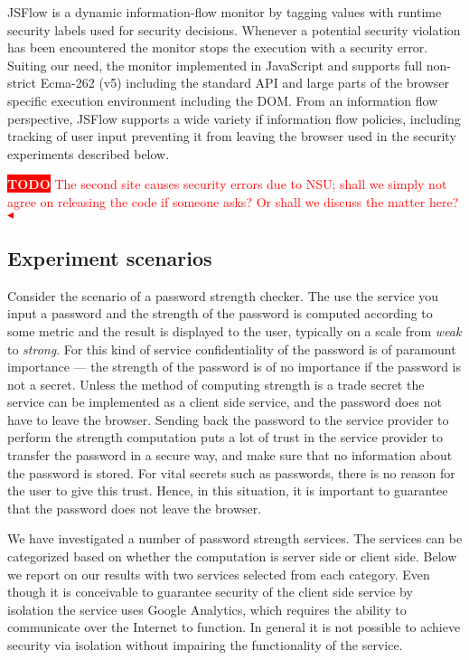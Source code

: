 \documentclass{llncs}
\newcommand{\todo}[1]{\colorbox{red}{\textcolor{white}{\sffamily\bfseries\scriptsize TODO}} \textcolor{red}{#1} \textcolor{red}{$\blacktriangleleft$}}
\begin{document}
JSFlow is a dynamic information-flow monitor by tagging values with runtime
security labels used for security decisions. Whenever a potential security
violation has been encountered the monitor stops the execution with a security
error. Suiting our need, the monitor implemented in JavaScript and supports
full non-strict Ecma-262 (v5) including the standard API and large parts of the
browser specific execution environment including the DOM.  From an information
flow perspective, JSFlow supports a wide variety if information flow policies,
including tracking of user input preventing it from leaving the browser used in
the security experiments described below.

\todo{The second site causes security errors due to NSU; shall we simply not agree on releasing the code if someone asks? Or shall we discuss the matter here?}

\subsection{Experiment scenarios}

Consider the scenario of a password strength checker. The use the service
you input a password and the strength of the password is computed according
to some metric and the result is displayed to the user, typically on a scale
from \emph{weak} to \emph{strong}.
%
For this kind of service confidentiality of the password is of paramount importance --- 
the strength of the password is of no importance if the password is not a secret.
Unless the method of computing strength is a trade secret the service can be
implemented as a client side service, and the password does not have to leave the
browser. Sending back the password to the service provider to perform
the strength computation puts a lot of trust in the service provider to transfer the
password in a secure way, and make sure that no information about the password
is stored. For vital secrets such as passwords, there is no reason for the user
to give this trust. Hence, in this situation, it is important to guarantee that
the password does not leave the browser.

We have investigated a number of password strength services. The services can
be categorized based on whether the computation is server side or client side.
Below we report on our results with two services selected from each category. 
Even though it is conceivable to guarantee security of the client side service
by isolation the service uses Google Analytics, which requires the ability
to communicate over the Internet to function. In general it is not possible
to achieve security via isolation without impairing the functionality of
the service.
\end{document}
